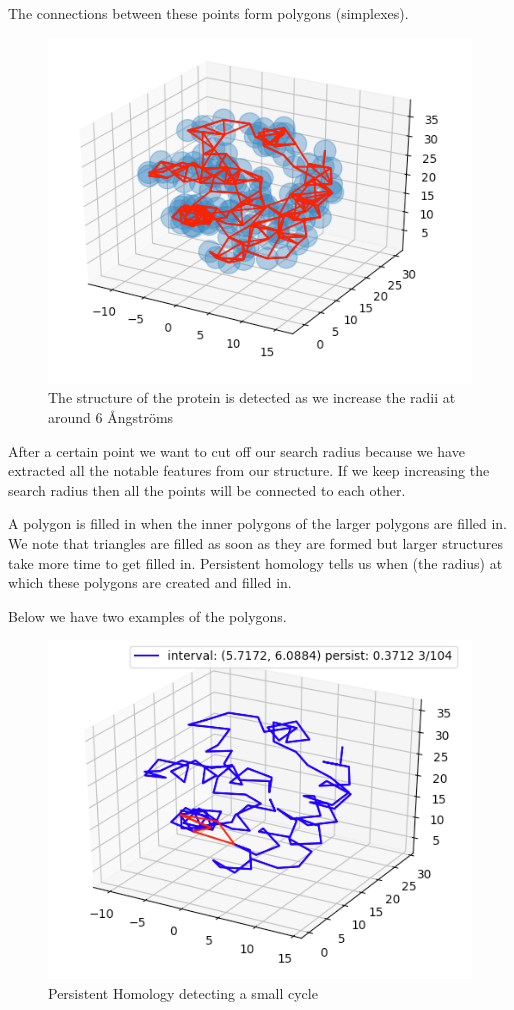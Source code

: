 \documentclass[12pt, a4paper, twocolumn, fullpage]{article}
\theoremstyle{plain}
\theoremstyle{definition}
\theoremstyle{remark}
\begin{document}
The connections between these points form polygons (simplexes).
\begin{figure}[t]
    \includegraphics[width=\linewidth]{img/hom/ballRad3.png}
    \caption{The structure of the protein is detected as we increase the radii at around 6 Ångströms}
    \label{ballRad3}
\end{figure}
After a certain point we want to cut off our search radius because we have extracted all the notable features from our structure. If we keep increasing the search radius then all the points will be connected to each other.

A polygon is filled in when the inner polygons of the larger polygons are filled in. We note that triangles are filled as soon as they are formed but larger structures take more time to get filled in.
Persistent homology tells us when (the radius) at which these polygons are created and filled in.

Below we have two examples of the polygons.
\begin{figure}
    \includegraphics[width=\linewidth]{img/hom/Simplex1.png}
    \caption{Persistent Homology detecting a small cycle }
    \label{Simplex1}
\end{figure}
\end{document}

